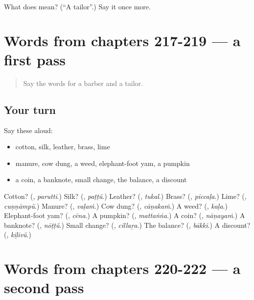 \begin{tcolorbox}[breakable,colback=teal!4,colframe=teal!35!black,title={Before you move on}]
What does  mean? (\textquotedblleft{}A tailor\textquotedblright{}.) Say it once more.
\end{tcolorbox}
\section[(dialogue)]{Words from chapters 217-219 — a first pass}

\label{lesson:ML-R222-first-pass-words-from-chapters-217-219}



\begin{quote}
Say the words for a barber and a tailor.
\end{quote}

\subsection*{Your turn}
Say these aloud:

\begin{itemize}
\raggedright
  \item cotton, silk, leather, brass, lime
  \item manure, cow dung, a weed, elephant-foot yam, a pumpkin
  \item a coin, a banknote, small change, the balance, a discount
\end{itemize}

\begin{tcolorbox}[breakable,colback=teal!4,colframe=teal!35!black,title={Before you move on}]
Cotton? (\textbf{}, \emph{parutti}.) Silk? (\textbf{}, \emph{paṭṭŭ}.) Leather? (\textbf{}, \emph{tukal}.) Brass? (\textbf{}, \emph{piccaḷa}.) Lime? (\textbf{}, \emph{cuṇṇāmpŭ}.) Manure? (\textbf{}, \emph{vaḷaṁ}.) Cow dung? (\textbf{}, \emph{cāṇakaṁ}.) A weed? (\textbf{}, \emph{kaḷa}.) Elephant-foot yam? (\textbf{}, \emph{cēna}.) A pumpkin? (\textbf{}, \emph{mattaṅṅa}.) A coin? (\textbf{}, \emph{nāṇayaṁ}.) A banknote? (\textbf{}, \emph{nōṭṭŭ}.) Small change? (\textbf{}, \emph{cillaṟa}.) The balance? (\textbf{}, \emph{bākki}.) A discount? (\textbf{}, \emph{kiḻivŭ}.)
\end{tcolorbox}
\section[(dialogue)]{Words from chapters 220-222 — a second pass}

